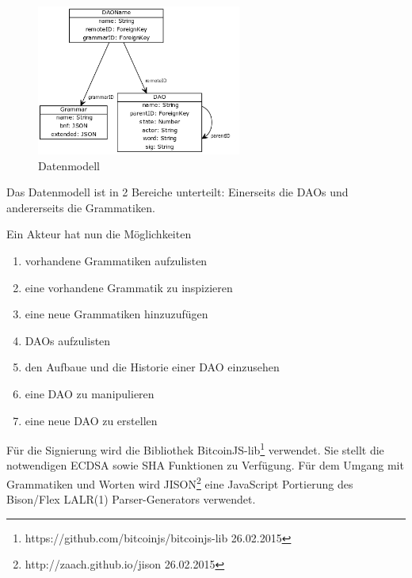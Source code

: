 \documentclass[a4paper,12pt]{report}
\begin{document}

\begin{figure}[ht]
    \centering
    \includegraphics[width=0.60\textwidth]{bilder/dataModel.png}
    \caption{Datenmodell}
\end{figure}

Das Datenmodell ist in 2 Bereiche unterteilt: Einerseits die DAOs und andererseits die Grammatiken. 

Ein Akteur hat nun die Möglichkeiten 

\begin{enumerate}
  \item vorhandene Grammatiken aufzulisten
  \item eine vorhandene Grammatik zu inspizieren
  \item eine neue Grammatiken hinzuzufügen
  \item DAOs aufzulisten
  \item den Aufbaue und die Historie einer DAO einzusehen
  \item eine DAO zu manipulieren
  \item eine neue DAO zu erstellen
\end{enumerate}

Für die Signierung wird die Bibliothek BitcoinJS-lib\footnote{https://github.com/bitcoinjs/bitcoinjs-lib 26.02.2015} verwendet. Sie stellt die notwendigen ECDSA sowie SHA Funktionen zu Verfügung. Für dem Umgang mit Grammatiken und Worten wird JISON\footnote{http://zaach.github.io/jison 26.02.2015} eine JavaScript Portierung des Bison/Flex LALR(1) Parser-Generators verwendet.
\end{document}
